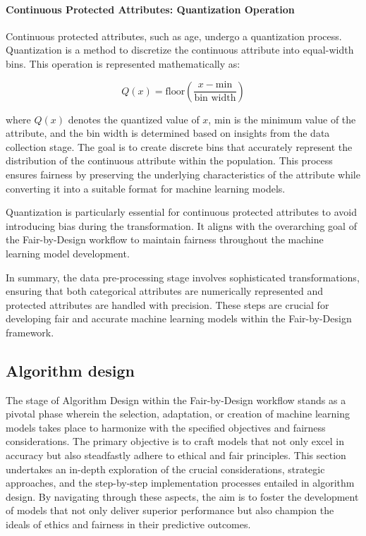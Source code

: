 \paragraph{Continuous Protected Attributes: Quantization Operation}
Continuous protected attributes, such as age, undergo a quantization process. Quantization is a method to discretize the continuous attribute into equal-width bins. This operation is represented mathematically as:

\[ Q(x) = \text{{floor}}\left(\frac{{x - \text{{min}}}}{{\text{{bin width}}}}\right) \]

where \( Q(x) \) denotes the quantized value of \( x \), \(\text{{min}}\) is the minimum value of the attribute, and the bin width is determined based on insights from the data collection stage. The goal is to create discrete bins that accurately represent the distribution of the continuous attribute within the population. This process ensures fairness by preserving the underlying characteristics of the attribute while converting it into a suitable format for machine learning models.

Quantization is particularly essential for continuous protected attributes to avoid introducing bias during the transformation. It aligns with the overarching goal of the Fair-by-Design workflow to maintain fairness throughout the machine learning model development.

In summary, the data pre-processing stage involves sophisticated transformations, ensuring that both categorical attributes are numerically represented and protected attributes are handled with precision. These steps are crucial for developing fair and accurate machine learning models within the Fair-by-Design framework.

\subsection{Algorithm design}
\label{subsection:algorithm}

The stage of Algorithm Design within the Fair-by-Design workflow stands as a pivotal phase wherein the selection, adaptation, or creation of machine learning models takes place to harmonize with the specified objectives and fairness considerations. The primary objective is to craft models that not only excel in accuracy but also steadfastly adhere to ethical and fair principles. This section undertakes an in-depth exploration of the crucial considerations, strategic approaches, and the step-by-step implementation processes entailed in algorithm design. By navigating through these aspects, the aim is to foster the development of models that not only deliver superior performance but also champion the ideals of ethics and fairness in their predictive outcomes.

